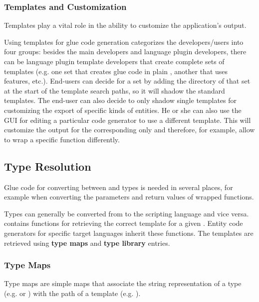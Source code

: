 \subsubsection{Templates and Customization}

Templates play a vital role in the ability to customize the application's output.

Using templates for glue code generation categorizes the developers/users into four groups: besides the  main developers and language plugin developers, there can be language plugin template developers that create complete sets of templates (e.g. one set that creates glue code in plain , another that uses  features, etc.).  End-users can decide for a set by adding the directory of that set at the start of the template search paths, so it will shadow the standard templates. The end-user can also decide to only shadow single templates for customizing the export of specific kinds of entities. He or she can also use the GUI for editing a particular code generator to use a different template. This will customize the output for the corresponding  only and therefore, for example, allow to wrap a specific  function differently.

\subsection{Type Resolution}

Glue code for converting between  and  types is needed in several places, for example when converting the parameters and return values of wrapped functions.

Types can generally be converted from  to the scripting language and vice versa.  contains functions for retrieving the correct template for a given . Entity code generators for specific target languages inherit these functions. The templates are retrieved using \textbf{type maps} and \textbf{type library} entries.

\subsubsection{Type Maps}

Type maps are simple maps that associate the string representation of \linebreak a type (e.g.  or ) with the path of a template \linebreak(e.g. ). 

